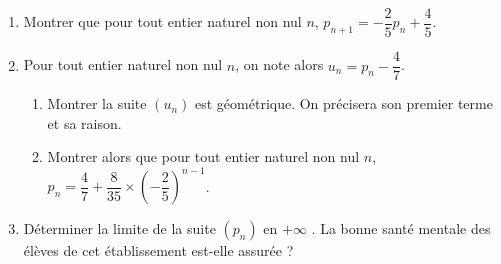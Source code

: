 \documentclass[11pt,fleqn, openany]{book} %
\begin{document}
\begin{exercise}[topic=prob01]
\begin{enumerate}
\begin{center}
\end{center}

    \item Montrer que pour tout entier naturel non nul $n$, $p_{n+1}=-\dfrac{2}{5}p_n+\dfrac{4}{5}$.
    \item Pour tout entier naturel non nul $n$, on note alors $u_n=p_n-\dfrac{4}{7}$.
    \begin{enumerate}
        \item Montrer la suite $(u_n)$ est géométrique. On précisera son premier terme et sa raison.
        \item Montrer alors que pour tout entier naturel non nul $n$, $p_n=\dfrac{4}{7}+\dfrac{8}{35} \times \left(-\dfrac{2}{5}\right)^{n-1}$.
    \end{enumerate}
    \item Déterminer la limite de la suite $(p_n)$ en $+\infty$ . La bonne santé mentale des élèves de cet établissement est-elle assurée ?
\end{enumerate}
\end{exercise}
\end{document}
